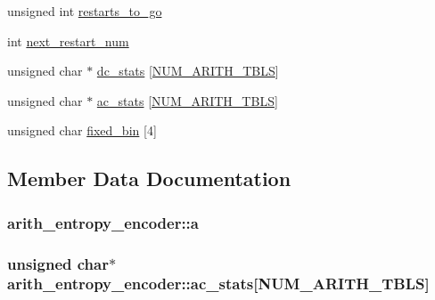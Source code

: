 \begin{DoxyCompactItemize}
unsigned int \hyperlink{structarith__entropy__encoder_add27b20b9b70a05f49c4242844253109}{restarts\+\_\+to\+\_\+go}
\item 
int \hyperlink{structarith__entropy__encoder_ad523833a7d6fa8c645fb9d18de18b487}{next\+\_\+restart\+\_\+num}
\item 
unsigned char $\ast$ \hyperlink{structarith__entropy__encoder_add54e8b278b9eea4aa6ee85ea2de4307}{dc\+\_\+stats} \mbox{[}\hyperlink{jpeglib_8h_a4efb0fccc8d9db72ca18f32a26fad6ab}{N\+U\+M\+\_\+\+A\+R\+I\+T\+H\+\_\+\+T\+B\+L\+S}\mbox{]}
\item 
unsigned char $\ast$ \hyperlink{structarith__entropy__encoder_a42b982c858027226af51485fa8b0bf22}{ac\+\_\+stats} \mbox{[}\hyperlink{jpeglib_8h_a4efb0fccc8d9db72ca18f32a26fad6ab}{N\+U\+M\+\_\+\+A\+R\+I\+T\+H\+\_\+\+T\+B\+L\+S}\mbox{]}
\item 
unsigned char \hyperlink{structarith__entropy__encoder_a06cb7a9a6db5a785f6630e5b5606ae5d}{fixed\+\_\+bin} \mbox{[}4\mbox{]}
\end{DoxyCompactItemize}


\subsection{Member Data Documentation}
\hypertarget{structarith__entropy__encoder_afdfd4096eabee6a199afe6764b1ea35a}{}
\subsubsection[{a}]{ arith\+\_\+entropy\+\_\+encoder\+::a}\label{structarith__entropy__encoder_afdfd4096eabee6a199afe6764b1ea35a}
\hypertarget{structarith__entropy__encoder_a42b982c858027226af51485fa8b0bf22}{}
\subsubsection[{ac\+\_\+stats}]{\setlength{\rightskip}{0pt plus 5cm}unsigned char$\ast$ arith\+\_\+entropy\+\_\+encoder\+::ac\+\_\+stats\mbox{[}{\bf N\+U\+M\+\_\+\+A\+R\+I\+T\+H\+\_\+\+T\+B\+L\+S}\mbox{]}}\label{structarith__entropy__encoder_a42b982c858027226af51485fa8b0bf22}
\hypertarget{structarith__entropy__encoder_a404b730ace823b7212e4953146d02159}{}
